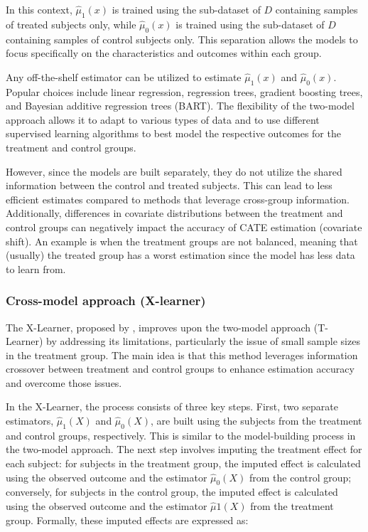 In this context, $\hat{\mu}_1(x)$ is trained using the sub-dataset of $D$ containing samples of treated subjects only, while $\hat{\mu}_0(x)$ is trained using the sub-dataset of $D$ containing samples of 
control subjects only. This separation allows the models to focus specifically on the characteristics and outcomes within each group.

Any off-the-shelf estimator can be utilized to estimate $\hat{\mu}_1(x)$ and $\hat{\mu}_0(x)$. Popular choices include linear regression, regression trees, gradient boosting trees, and Bayesian additive regression trees (BART). 
The flexibility of the two-model approach allows it to adapt to various types of data and to use different supervised learning algorithms to best model the respective outcomes for the treatment and control groups.

However, since the models are built separately, they do not utilize the shared information between the control and treated subjects. This can lead to less efficient estimates compared to methods that leverage cross-group information.
Additionally, differences in covariate distributions between the treatment and control groups can negatively impact the accuracy of CATE estimation (covariate shift). An example is when the treatment groups are not balanced, 
meaning that (usually) the treated group has a worst estimation since the model has less data to learn from.

\subsubsection{Cross-model approach (X-learner)}

The X-Learner, proposed by \textcite{kunzel_metalearners_2019}, improves upon the two-model approach (T-Learner) by addressing its limitations, particularly the issue of small sample sizes in the treatment group. 
The main idea is that this method leverages information crossover between treatment and control groups to enhance estimation accuracy and overcome those issues.

In the X-Learner, the process consists of three key steps. First, two separate estimators, $\hat{\mu}_1(X)$ and $\hat{\mu}_0(X)$, are built using the subjects from the treatment and control groups, respectively.
This is similar to the model-building process in the two-model approach. The next step involves imputing the treatment effect for each subject: for subjects in the treatment group, the imputed effect is calculated 
using the observed outcome and the estimator $\hat{\mu}_0(X)$ from the control group; conversely, for subjects in the control group, the imputed effect is calculated using the observed outcome and the estimator 
$\hat{\mu}1(X)$ from the treatment group. Formally, these imputed effects are expressed as:

